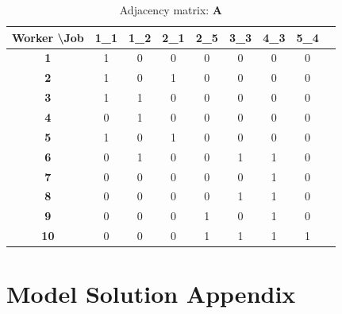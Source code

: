 \documentclass[12pt]{article}
\theoremstyle{definition}
\theoremstyle{plain}
\begin{document}
\begin{table}[h!]
	\centering
	\caption{Adjacency matrix: $\mathbf{A}$}
	\begin{tabular}{c|cccccccc} %
		\toprule
		\textbf{Worker \textbackslash Job} & \textbf{1\_1} & \textbf{1\_2} & \textbf{2\_1} & \textbf{2\_5} & \textbf{3\_3} & \textbf{4\_3} & \textbf{5\_4}  \\
		\midrule
		\textbf{1}                         & 1             & 0             & 0             & 0             & 0             & 0             & 0   \\
		\textbf{2}                         & 1             & 0             & 1             & 0             & 0             & 0             & 0   \\
		\textbf{3}                         & 1             & 1             & 0             & 0             & 0             & 0             & 0   \\
		\textbf{4}                         & 0             & 1             & 0             & 0             & 0             & 0             & 0   \\
		\textbf{5}                         & 1             & 0             & 1             & 0             & 0             & 0             & 0   \\
		\textbf{6}                         & 0             & 1             & 0             & 0             & 1             & 1             & 0   \\
		\textbf{7}                         & 0             & 0             & 0             & 0             & 0             & 1             & 0   \\
		\textbf{8}                         & 0             & 0             & 0             & 0             & 1             & 1             & 0   \\
		\textbf{9}                         & 0             & 0             & 0             & 1             & 0             & 1             & 0   \\
		\textbf{10}                        & 0             & 0             & 0             & 1             & 1             & 1             & 1   \\
	\bottomrule
	\end{tabular}
	\label{table:adjacency_appendix}
\end{table}

\clearpage

\section{Model Solution Appendix}
\end{document}
